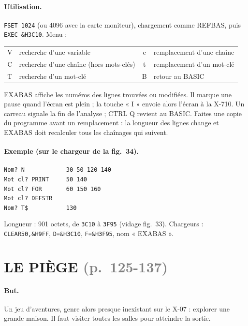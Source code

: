 \documentclass[a4paper,10pt]{article}
\newcommand{\hex}[1]{\texttt{#1}}
\newcommand{\pg}[1]{\texorpdfstring{\textcolor{gray}{\small(p.~#1)}}{}}
\begin{document}
\paragraph{Utilisation.} \texttt{FSET 1024} (ou 4096 avec la carte
moniteur), chargement comme REFBAS, puis \texttt{EXEC \&H3C10}. Menu :
\begin{center}\small
\begin{tabular}{@{}cl|cl@{}}
\toprule
V & recherche d'une variable & c & remplacement d'une chaîne \\
C & recherche d'une chaîne (hors mots-clés) & t & remplacement d'un mot-clé \\
T & recherche d'un mot-clé & B & retour au BASIC \\
\bottomrule
\end{tabular}
\end{center}
EXABAS affiche les numéros des lignes trouvées ou modifiées. Il marque une
pause quand l'écran est plein ; la touche « I » envoie alors l'écran à la
X-710. Un carreau signale la fin de l'analyse ; CTRL Q revient au BASIC.
Faites une copie du programme avant un remplacement : la longueur des lignes
change et EXABAS doit recalculer tous les chaînages qui suivent.

\paragraph{Exemple (sur le chargeur de la fig.~34).}
\begin{verbatim}
Nom? N            30 50 120 140
Mot cl? PRINT     50 140
Mot cl? FOR       60 150 160
Mot cl? DEFSTR
Nom? T$           130
\end{verbatim}
Longueur : 901 octets, de \hex{3C10} à \hex{3F95} (vidage fig.~33).
Chargeurs : \texttt{CLEAR50,\&H9FF}, \texttt{D=\&H3C10}, \texttt{F=\&H3F95},
nom « EXABAS ».

\section{LE PIÈGE \pg{125-137}}

\paragraph{But.} Un jeu d'aventures, genre alors presque inexistant sur le
X-07 : explorer une grande maison. Il faut visiter toutes les salles pour
atteindre la sortie.
\end{document}
